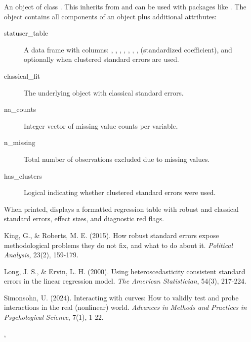 \documentclass[a4paper]{book}
\begin{document}
\begin{Value}
An object of class . This inherits 
from  and can be used with packages like 
. The object contains all components of an  
object plus additional attributes:
\begin{description}

\item[statuser\_table] A data frame with columns: , , 
, , , , , 
 (standardized coefficient), and optionally  when 
clustered standard errors are used.
\item[classical\_fit] The underlying  object with classical standard errors.
\item[na\_counts] Integer vector of missing value counts per variable.
\item[n\_missing] Total number of observations excluded due to missing values.
\item[has\_clusters] Logical indicating whether clustered standard errors were used.

\end{description}

When printed, displays a formatted regression table with robust and classical 
standard errors, effect sizes, and diagnostic red flags.
\end{Value}
%
\begin{References}
King, G., \& Roberts, M. E. (2015). How robust standard errors expose methodological 
problems they do not fix, and what to do about it. \emph{Political Analysis}, 23(2), 159-179.

Long, J. S., \& Ervin, L. H. (2000). Using heteroscedasticity consistent standard errors 
in the linear regression model. \emph{The American Statistician}, 54(3), 217-224.

Simonsohn, U. (2024). Interacting with curves: How to validly test and probe 
interactions in the real (nonlinear) world. \emph{Advances in Methods and Practices in 
Psychological Science}, 7(1), 1-22.
\end{References}
%
\begin{SeeAlso}
, 
\end{SeeAlso}
%
\end{document}
